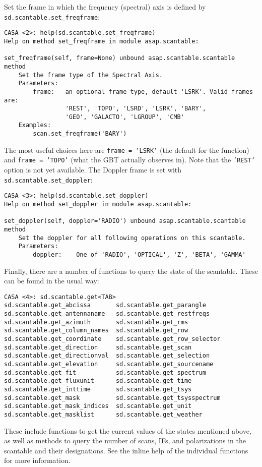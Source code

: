 Set the frame in which the frequency (spectral) axis is defined by {\tt sd.scantable.set\_freqframe}:
\small
\begin{verbatim}
CASA <2>: help(sd.scantable.set_freqframe)
Help on method set_freqframe in module asap.scantable:

set_freqframe(self, frame=None) unbound asap.scantable.scantable method
    Set the frame type of the Spectral Axis.
    Parameters:
        frame:   an optional frame type, default 'LSRK'. Valid frames are:
                 'REST', 'TOPO', 'LSRD', 'LSRK', 'BARY',
                 'GEO', 'GALACTO', 'LGROUP', 'CMB'
    Examples:
        scan.set_freqframe('BARY')
\end{verbatim}
\normalsize
The most useful choices here are {\tt frame = 'LSRK'} (the default for
the function) and {\tt frame = 'TOPO'} (what the GBT actually observes
in).  Note that the {\tt 'REST'} option is not yet available.
The Doppler frame is set with {\tt sd.scantable.set\_doppler}:
\small
\begin{verbatim}
CASA <3>: help(sd.scantable.set_doppler)
Help on method set_doppler in module asap.scantable:

set_doppler(self, doppler='RADIO') unbound asap.scantable.scantable method
    Set the doppler for all following operations on this scantable.
    Parameters:
        doppler:    One of 'RADIO', 'OPTICAL', 'Z', 'BETA', 'GAMMA'
\end{verbatim}
\normalsize

Finally, there are a number of functions to query the state of the
scantable.  These can be found in the usual way:
\small
\begin{verbatim}
CASA <4>: sd.scantable.get<TAB>
sd.scantable.get_abcissa       sd.scantable.get_parangle
sd.scantable.get_antennaname   sd.scantable.get_restfreqs
sd.scantable.get_azimuth       sd.scantable.get_rms
sd.scantable.get_column_names  sd.scantable.get_row
sd.scantable.get_coordinate    sd.scantable.get_row_selector
sd.scantable.get_direction     sd.scantable.get_scan
sd.scantable.get_directionval  sd.scantable.get_selection
sd.scantable.get_elevation     sd.scantable.get_sourcename
sd.scantable.get_fit           sd.scantable.get_spectrum
sd.scantable.get_fluxunit      sd.scantable.get_time
sd.scantable.get_inttime       sd.scantable.get_tsys
sd.scantable.get_mask          sd.scantable.get_tsysspectrum
sd.scantable.get_mask_indices  sd.scantable.get_unit
sd.scantable.get_masklist      sd.scantable.get_weather
\end{verbatim}
\normalsize
These include functions to get the current values of the states
mentioned above, as well as
methods to query the number of scans, IFs, and polarizations
in the scantable and their designations.  See the
inline help of the individual functions for more information.

